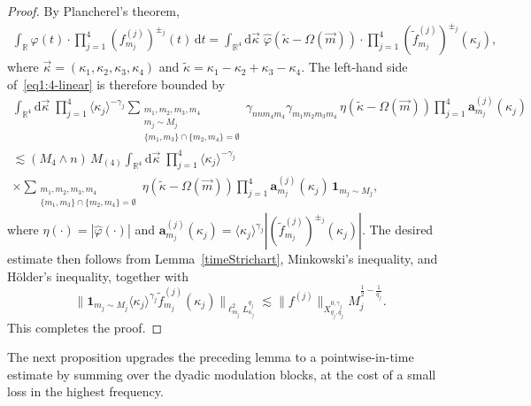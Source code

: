 \documentclass[11pt,reqno,english]{amsart}
\numberwithin{equation}{section}
\theoremstyle{plain}
\theoremstyle{definition}
\theoremstyle{remark}
\newcommand{\R}{\mathbb{R}}
\newcommand{\la}{\langle}
\newcommand{\ra}{\rangle}
\newcommand{\dd}{\mathrm{d}}
\begin{document}
\begin{proof}
	By Plancherel's theorem,
	\begin{align*}
		\int_{\R} \varphi(t)\cdot \prod_{j=1}^4 (f_{m_j}^{(j)})^{\pm_j}(t)\, \dd t
		=
		\int_{\R^4}\dd\vec{\kappa}\; \widehat{\varphi}(\widetilde{\kappa}-\Omega(\vec{m}))\cdot \prod_{j=1}^4(\widetilde{f}_{m_j}^{(j)})^{\pm_j}(\kappa_j),
	\end{align*}
	where $\vec{\kappa}=(\kappa_1,\kappa_2,\kappa_3,\kappa_4)$ and $\widetilde{\kappa}=\kappa_1-\kappa_2+\kappa_3-\kappa_4$.
	The left-hand side of~\eqref{eq1:4-linear} is therefore bounded by
	\begin{multline}\label{pf4-linear-1}
		\int_{\R^4}\dd\vec{\kappa}\;
		\prod_{j=1}^4\la\kappa_j\ra^{-\gamma_j}
		\sum_{\substack{m_1,m_2,m_3,m_4\\
				m_j\sim M_j\\
				\{m_1,m_3\}\cap\{m_2,m_4\}=\emptyset}} \gamma_{nnm_4m_4}\gamma_{m_1m_2m_3m_4}\,\eta(\widetilde{\kappa}-\Omega(\vec{m}))\prod_{j=1}^4\mathbf{a}^{(j)}_{m_j}(\kappa_j)\\
		\lesssim
		(M_4\wedge n)\,M_{(4)}\int_{\R^4}\dd\vec{\kappa}\;
		\prod_{j=1}^4\la\kappa_j\ra^{-\gamma_j}
		\\\times\sum_{\substack{m_1,m_2,m_3,m_4\\
				\{m_1,m_3\}\cap\{m_2,m_4\}=\emptyset}} \eta(\widetilde{\kappa}-\Omega(\vec{m}))\prod_{j=1}^4\mathbf{a}^{(j)}_{m_j}(\kappa_j)\,\mathbf{1}_{m_j\sim M_j},
	\end{multline}
	where $\eta(\cdot)=|\widehat{\varphi}(\cdot)|$ and $\mathbf{a}_{m_j}^{(j)}(\kappa_j)=\la\kappa_j\ra^{\gamma_j}|(\widetilde{f}^{(j)}_{m_j})^{\pm_j}(\kappa_j)|$. The desired estimate then follows from Lemma~\ref{timeStrichart}, Minkowski's inequality, and H\"older's inequality, together with
	\[
	\|\mathbf{1}_{m_j\sim M_j}\la\kappa_j\ra^{\gamma_j} \widetilde{f}_{m_j}^{(j)}(\kappa_j)\|_{\ell_{m_j}^2 L_{\kappa_j}^{q_j}}
	\lesssim
	\|f^{(j)}\|_{X_{q_j,q_j}^{0,\gamma_j}}M_j^{\frac{1}{2}-\frac{1}{q_j}}.
	\]
	This completes the proof.
\end{proof}

The next proposition upgrades the preceding lemma to a pointwise-in-time estimate by summing over the dyadic modulation blocks, at the cost of a small loss in the highest frequency.
\end{document}
